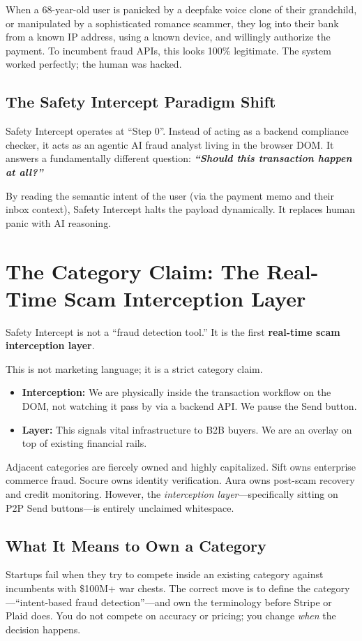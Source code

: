 \documentclass[12pt, letterpaper]{article}
\begin{document}
When a 68-year-old user is panicked by a deepfake voice clone of their grandchild, or manipulated by a sophisticated romance scammer, they log into their bank from a known IP address, using a known device, and willingly authorize the payment. To incumbent fraud APIs, this looks 100\% legitimate. The system worked perfectly; the human was hacked.

\subsection{The Safety Intercept Paradigm Shift}
Safety Intercept operates at ``Step 0''. Instead of acting as a backend compliance checker, it acts as an agentic AI fraud analyst living in the browser DOM. It answers a fundamentally different question: \textbf{\textit{``Should this transaction happen at all?''}}

By reading the semantic intent of the user (via the payment memo and their inbox context), Safety Intercept halts the payload dynamically. It replaces human panic with AI reasoning.

\newpage
\section{The Category Claim: The Real-Time Scam Interception Layer}

Safety Intercept is not a ``fraud detection tool.'' It is the first \textbf{real-time scam interception layer}. 

This is not marketing language; it is a strict category claim. 
\begin{itemize}
    \item \textbf{Interception:} We are physically inside the transaction workflow on the DOM, not watching it pass by via a backend API. We pause the Send button.
    \item \textbf{Layer:} This signals vital infrastructure to B2B buyers. We are an overlay on top of existing financial rails.
\end{itemize}

Adjacent categories are fiercely owned and highly capitalized. Sift owns enterprise commerce fraud. Socure owns identity verification. Aura owns post-scam recovery and credit monitoring. However, the \textit{interception layer}—specifically sitting on P2P Send buttons—is entirely unclaimed whitespace. 

\subsection{What It Means to Own a Category}
Startups fail when they try to compete inside an existing category against incumbents with \$100M+ war chests. The correct move is to define the category—``intent-based fraud detection''—and own the terminology before Stripe or Plaid does. You do not compete on accuracy or pricing; you change \textit{when} the decision happens.
\end{document}
